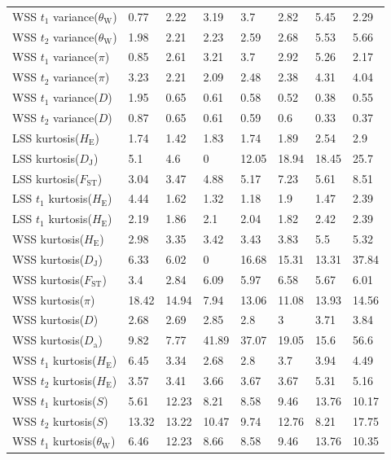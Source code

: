 \documentclass[a4paper, 12pt]{article}
\begin{document}
\begin{tiny}
\begin{longtable}{p{3.0cm}p{1.0cm}p{1.0cm}p{1.0cm}p{1.0cm}p{1.0cm}p{1.0cm}p{1.0cm}}
WSS $t_1$ variance($\theta_{\mathrm{W}}$) & 0.77 & 2.22 & 3.19 & 3.7 & 2.82 & 5.45 & 2.29 \\
WSS $t_2$ variance($\theta_{\mathrm{W}}$) & 1.98 & 2.21 & 2.23 & 2.59 & 2.68 & 5.53 & 5.66 \\
WSS $t_1$ variance($\pi$) & 0.85 & 2.61 & 3.21 & 3.7 & 2.92 & 5.26 & 2.17 \\
WSS $t_2$ variance($\pi$) & 3.23 & 2.21 & 2.09 & 2.48 & 2.38 & 4.31 & 4.04 \\
WSS $t_1$ variance($D$) & 1.95 & 0.65 & 0.61 & 0.58 & 0.52 & 0.38 & 0.55 \\
WSS $t_2$ variance($D$) & 0.87 & 0.65 & 0.61 & 0.59 & 0.6 & 0.33 & 0.37 \\
LSS kurtosis($H_{\mathrm{E}}$) & 1.74 & 1.42 & 1.83 & 1.74 & 1.89 & 2.54 & 2.9 \\
LSS kurtosis($D_{\mathrm{J}}$) & 5.1 & 4.6 & 0 & 12.05 & 18.94 & 18.45 & 25.7 \\
LSS kurtosis($F_{\mathrm{ST}}$) & 3.04 & 3.47 & 4.88 & 5.17 & 7.23 & 5.61 & 8.51 \\
LSS $t_1$ kurtosis($H_{\mathrm{E}}$) & 4.44 & 1.62 & 1.32 & 1.18 & 1.9 & 1.47 & 2.39 \\
LSS $t_1$ kurtosis($H_{\mathrm{E}}$) & 2.19 & 1.86 & 2.1 & 2.04 & 1.82 & 2.42 & 2.39 \\
WSS kurtosis($H_{\mathrm{E}}$) & 2.98 & 3.35 & 3.42 & 3.43 & 3.83 & 5.5 & 5.32 \\
WSS kurtosis($D_{\mathrm{J}}$) & 6.33 & 6.02 & 0 & 16.68 & 15.31 & 13.31 & 37.84 \\
WSS kurtosis($F_{\mathrm{ST}}$) & 3.4 & 2.84 & 6.09 & 5.97 & 6.58 & 5.67 & 6.01 \\
WSS kurtosis($\pi$) & 18.42 & 14.94 & 7.94 & 13.06 & 11.08 & 13.93 & 14.56 \\
WSS kurtosis($D$) & 2.68 & 2.69 & 2.85 & 2.8 & 3 & 3.71 & 3.84 \\
WSS kurtosis($D_{\mathrm{a}}$) & 9.82 & 7.77 & 41.89 & 37.07 & 19.05 & 15.6 & 56.6 \\
WSS $t_1$ kurtosis($H_{\mathrm{E}}$) & 6.45 & 3.34 & 2.68 & 2.8 & 3.7 & 3.94 & 4.49 \\
WSS $t_2$ kurtosis($H_{\mathrm{E}}$) & 3.57 & 3.41 & 3.66 & 3.67 & 3.67 & 5.31 & 5.16 \\
WSS $t_1$ kurtosis($S$) & 5.61 & 12.23 & 8.21 & 8.58 & 9.46 & 13.76 & 10.17 \\
WSS $t_2$ kurtosis($S$) & 13.32 & 13.22 & 10.47 & 9.74 & 12.76 & 8.21 & 17.75 \\
WSS $t_1$ kurtosis($\theta_{\mathrm{W}}$) & 6.46 & 12.23 & 8.66 & 8.58 & 9.46 & 13.76 & 10.35 \\

\end{longtable}
\end{tiny}
\end{document}
